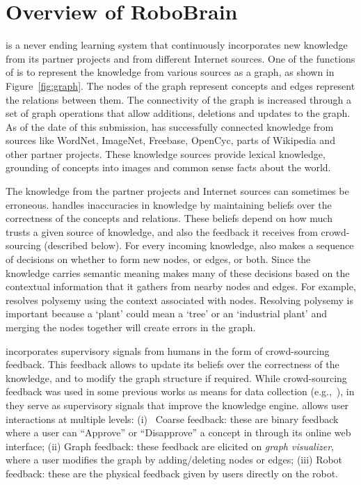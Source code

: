 
\section{Overview of RoboBrain}
\label{overviewPaper}

\robobrain{} is a never ending learning system  that  continuously incorporates
new knowledge from  its partner projects and from different Internet sources.
One of the functions of \robobrain{} is to represent the knowledge from various sources as a graph,
as shown in  Figure~\ref{fig:graph}. The nodes of the graph represent concepts and edges represent the
relations between them. The connectivity of the graph is increased through a set of graph operations
that allow additions, deletions and updates to the graph. As of the date of this submission,
\robobrain{} has successfully
connected knowledge from sources like WordNet, ImageNet, Freebase, OpenCyc,
 parts of Wikipedia and other partner projects. These knowledge sources provide lexical knowledge, grounding of concepts into images and common sense facts about the world.

The knowledge from the partner projects and Internet sources can sometimes be erroneous. \robobrain{}
handles inaccuracies in  knowledge by maintaining beliefs over the correctness of the concepts and
relations. These beliefs depend on how much \robobrain{} trusts a given source of knowledge, and also the
feedback it receives from crowd-sourcing (described below). For every incoming knowledge, \robobrain{}
also makes a sequence of decisions on whether to form new nodes, or edges, or both. Since the
knowledge carries semantic meaning \robobrain{} makes many of these decisions based on the
contextual information that it gathers from nearby nodes and edges. For example, \robobrain{} resolves
polysemy using the context associated with nodes. Resolving polysemy is important because a `plant'
could mean a `tree' or an `industrial plant' and merging the nodes together will create errors in the
graph.


\robobrain{} incorporates supervisory signals from humans in the form of crowd-sourcing feedback. This
feedback allows \robobrain{} to update its beliefs over the correctness of the knowledge, and to modify the
graph structure if required. While crowd-sourcing feedback was used in some previous works as
means for data collection (e.g.,~\citep{imagenet2009,Russell08}), in \robobrain{} they serve as supervisory
signals that improve the knowledge engine. \robobrain{} allows user interactions at multiple levels: (i)~
Coarse feedback: these are binary feedback where a user can ``Approve'' or ``Disapprove'' a concept
in \robobrain{} through its online web interface; (ii) Graph feedback: these feedback are elicited on 
\robobrain{} \textit{graph visualizer}, where a user modifies the graph by adding/deleting nodes or edges; (iii)
Robot feedback: these are the physical feedback given by users directly on the robot.

